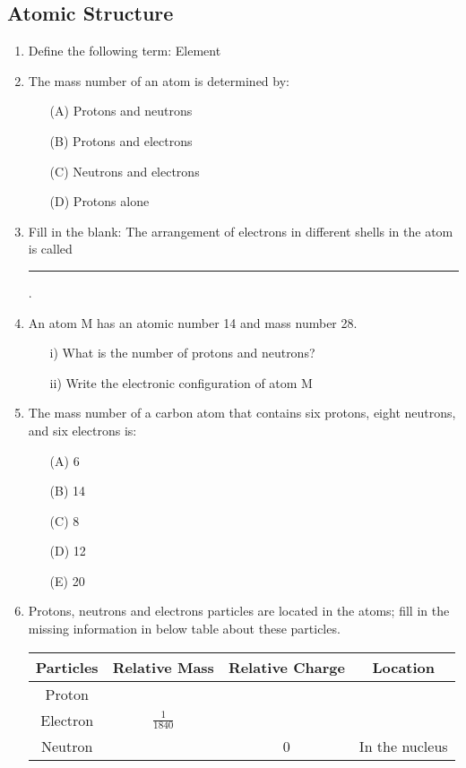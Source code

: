 \subsection{Atomic Structure}

\begin{enumerate}
	\item Define the following term: Element
	
	\item The mass number of an atom is determined by:
	\begin{enumerate}[topsep=0ex,itemsep=0ex,partopsep=1ex,parsep=1ex]
		\item[(A)] Protons and neutrons
		\item[(B)] Protons and electrons
		\item[(C)] Neutrons and electrons
		\item[(D)] Protons alone
	\end{enumerate}
	
	\item Fill in the blank: The arrangement of electrons in different shells in the atom is called \rule{1.5cm}{0.15mm}.
	
	\item An atom M has an atomic number 14 and mass number 28.
	\begin{enumerate}
		\item[i)] What is the number of protons and neutrons?
		\item[ii)] Write the electronic configuration of atom M
	\end{enumerate}

	\item The mass number of a carbon atom that contains six protons, eight neutrons, and six electrons is:
	\begin{enumerate}[topsep=0ex,itemsep=0ex,partopsep=1ex,parsep=1ex]
		\item[(A)] 6
		\item[(B)] 14
		\item[(C)] 8
		\item[(D)] 12
		\item[(E)] 20
	\end{enumerate}
	
	\item Protons, neutrons and electrons particles are located in the atoms; fill in the missing information in below table about these particles. 
	\begin{center}
		\begin{tabular}{|c|c|c|c|} \hline
			\textbf{Particles} & \textbf{Relative Mass} & \textbf{Relative Charge} & \textbf{Location} \\ \hline
			Proton & & & \\ \hline
			Electron & $\frac{1}{1840}$ & & \\ \hline
			Neutron & & 0 & In the nucleus \\ \hline
		\end{tabular}
	\end{center}
	
\end{enumerate}








